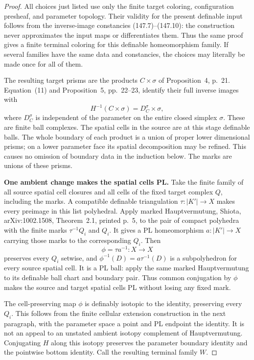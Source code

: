 \begin{proof}
All choices just listed use only the finite target coloring,
configuration presheaf, and parameter topology. Their validity for
the present definable input follows from the inverse-image
constancies (147.7)--(147.10): the construction never approximates
the input maps or differentiates them. Thus the same proof gives a
finite terminal coloring for this definable homeomorphism family.
If several families have the same data and constancies, the choices
may literally be made once for all of them.

The resulting target prisms are the products \(C\times\sigma\) of
Proposition~4, p.~21. Equation~(11) and Proposition~5, pp.~22--23,
identify their full inverse images with
\[
 H^{-1}(C\times\sigma)=D_C^\sigma\times\sigma,
 \tag{147.11}
\]
where \(D_C^\sigma\) is independent of the parameter on the entire
closed simplex \(\sigma\). These are finite ball complexes.
The spatial cells in the source are at this stage definable balls.
The whole boundary of each product is a union of proper lower
dimensional prisms; on a lower parameter face its spatial
decomposition may be refined. This causes no omission of boundary
data in the induction below. The marks are unions of these prisms.

\textbf{One ambient change makes the spatial cells PL.}\quad
Take the finite family of all source spatial cell closures and all
cells of the fixed target complex \(Q\), including the marks.
A compatible definable triangulation
\(\tau:|K'|\to X\) makes every preimage in this list polyhedral.
Apply marked Hauptvermutung, Shiota, arXiv:1002.1508,
Theorem~2.1, printed p.~5, to the pair of compact polyhedra with
the finite marks \(\tau^{-1}Q_i\) and \(Q_i\).
It gives a PL homeomorphism \(a:|K'|\to X\) carrying those marks
to the corresponding \(Q_i\). Then
\[
 \phi=\tau a^{-1}:X\to X
 \tag{147.12}
\]
preserves every \(Q_i\) setwise, and
\(\phi^{-1}(D)=a\tau^{-1}(D)\) is a subpolyhedron for every source
spatial cell. It is a PL ball: apply the same marked
Hauptvermutung to its definable ball chart and boundary pair.
Thus common conjugation by \(\phi\) makes the source and target
spatial cells PL without losing any fixed mark.

The cell-preserving map \(\phi\) is definably isotopic to the identity,
preserving every \(Q_i\). This follows from the finite cellular
extension construction in the next paragraph, with the parameter
space a point and PL endpoint the identity. It is not an appeal to
an unstated ambient isotopy complement of Hauptvermutung.
Conjugating \(H\) along this isotopy preserves the parameter boundary
identity and the pointwise bottom identity. Call the resulting
terminal family \(W\).


\end{proof}
